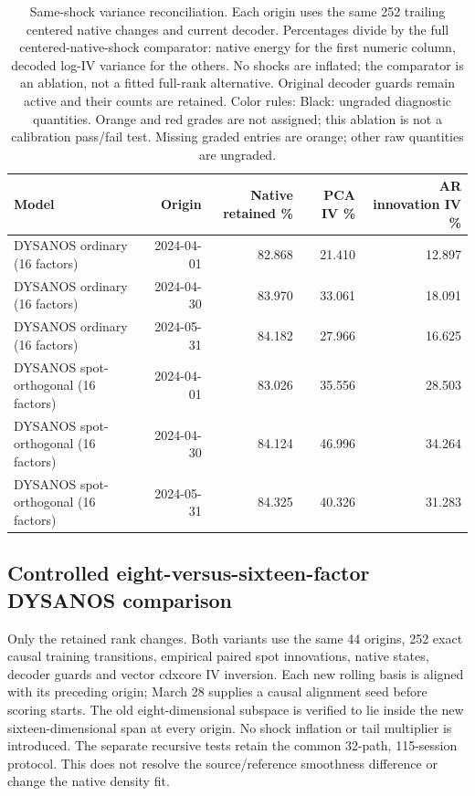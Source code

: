 \documentclass[11pt]{article}
\begin{document}
\begin{table}[H]\centering\small\setlength{\tabcolsep}{4pt}
\caption{Same-shock variance reconciliation. Each origin uses the same 252 trailing centered native changes and current decoder. Percentages divide by the full centered-native-shock comparator: native energy for the first numeric column, decoded log-IV variance for the others. No shocks are inflated; the comparator is an ablation, not a fitted full-rank alternative. Original decoder guards remain active and their counts are retained. Color rules: Black: ungraded diagnostic quantities. Orange and red grades are not assigned; this ablation is not a calibration pass/fail test. Missing graded entries are orange; other raw quantities are ungraded.}\label{tab:variance-reconciliation}
\begin{tabular}{@{}lrrrr@{}}
\toprule
Model & Origin & Native retained \% & PCA IV \% & AR innovation IV \% \\
\midrule
DYSANOS ordinary (16 factors) & 2024-04-01 & 82.868 & 21.410 & 12.897 \\
DYSANOS ordinary (16 factors) & 2024-04-30 & 83.970 & 33.061 & 18.091 \\
DYSANOS ordinary (16 factors) & 2024-05-31 & 84.182 & 27.966 & 16.625 \\
DYSANOS spot-orthogonal (16 factors) & 2024-04-01 & 83.026 & 35.556 & 28.503 \\
DYSANOS spot-orthogonal (16 factors) & 2024-04-30 & 84.124 & 46.996 & 34.264 \\
DYSANOS spot-orthogonal (16 factors) & 2024-05-31 & 84.325 & 40.326 & 31.283 \\
\bottomrule\end{tabular}\end{table}

\subsection{Controlled eight-versus-sixteen-factor DYSANOS comparison}

Only the retained rank changes. Both variants use the same 44 origins, 252 exact causal training transitions, empirical paired spot innovations, native states, decoder guards and vector cdxcore IV inversion. Each new rolling basis is aligned with its preceding origin; March 28 supplies a causal alignment seed before scoring starts. The old eight-dimensional subspace is verified to lie inside the new sixteen-dimensional span at every origin. No shock inflation or tail multiplier is introduced. The separate recursive tests retain the common 32-path, 115-session protocol. This does not resolve the source/reference smoothness difference or change the native density fit.
\end{document}
